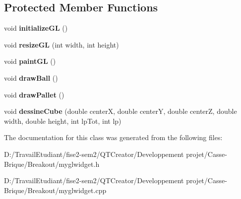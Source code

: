\subsection*{Protected Member Functions}
\begin{DoxyCompactItemize}
\item 
\mbox{\label{class_my_g_l_widget_a5c536c2ebab76533eb16eac0a9830c8e}} 
void {\bfseries initialize\+GL} ()
\item 
\mbox{\label{class_my_g_l_widget_a9717968e75b8a7fc358b947f31eb2690}} 
void {\bfseries resize\+GL} (int width, int height)
\item 
\mbox{\label{class_my_g_l_widget_ad0e4171fab09ad54d4e2d23e7d6541eb}} 
void {\bfseries paint\+GL} ()
\item 
\mbox{\label{class_my_g_l_widget_a170905e3688320a2286d3c19a3c4d83a}} 
void {\bfseries draw\+Ball} ()
\item 
\mbox{\label{class_my_g_l_widget_a895664084af28911b896b43335da71d0}} 
void {\bfseries draw\+Pallet} ()
\item 
\mbox{\label{class_my_g_l_widget_a493775e718c254eb669f75548eb7d870}} 
void {\bfseries dessine\+Cube} (double centerX, double centerY, double centerZ, double width, double height, int lp\+Tot, int lp)
\end{DoxyCompactItemize}


The documentation for this class was generated from the following files\+:\begin{DoxyCompactItemize}
\item 
D\+:/\+Travail\+Etudiant/fise2-\/sem2/\+Q\+T\+Creator/\+Developpement projet/\+Casse-\/\+Brique/\+Breakout/myglwidget.\+h\item 
D\+:/\+Travail\+Etudiant/fise2-\/sem2/\+Q\+T\+Creator/\+Developpement projet/\+Casse-\/\+Brique/\+Breakout/myglwidget.\+cpp\end{DoxyCompactItemize}
